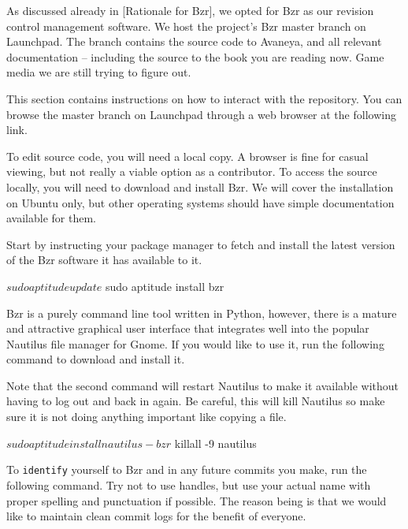 
As discussed already in [Rationale for Bzr], we opted for Bzr as our revision control management software. We host the project's Bzr master branch on Launchpad. The branch contains the source code to Avaneya, and all relevant documentation -- including the source to the book you are reading now. Game media we are still trying to figure out.

This section contains instructions on how to interact with the repository. You can browse the master branch on Launchpad through a web browser at the following link.

\startnarrower[3*left]
\stopnarrower

To edit source code, you will need a local copy. A browser is fine for casual viewing, but not really a viable option as a contributor. To access the source locally, you will need to download and install Bzr. We will cover the installation on Ubuntu only, but other operating systems should have simple documentation available for them. 

Start by instructing your package manager to fetch and install the latest version of the Bzr software it has available to it.

\startCodeExample
$ sudo aptitude update
$ sudo aptitude install bzr 
\stopCodeExample

Bzr is a purely command line tool written in Python, however, there is a mature and attractive graphical user interface that integrates well into the popular Nautilus file manager for Gnome. If you would like to use it, run the following command to download and install it. 

Note that the second command will restart Nautilus to make it available without having to log out and back in again. Be careful, this will kill Nautilus so make sure it is not doing anything important like copying a file.

\startCodeExample
$ sudo aptitude install nautilus-bzr
$ killall -9 nautilus
\stopCodeExample

To {\tt identify} yourself to Bzr and in any future commits you make, run the following command. Try not to use handles, but use your actual name with proper spelling and punctuation if possible. The reason being is that we would like to maintain clean commit logs for the benefit of everyone.

